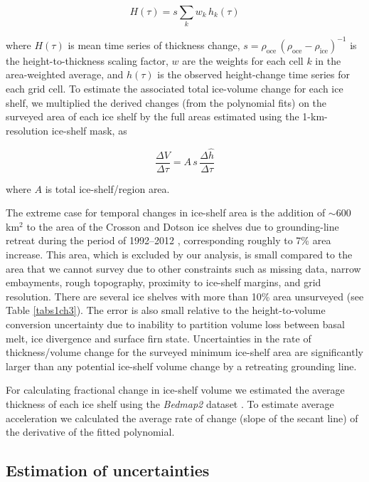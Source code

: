 \begin{equation}
  H(\tau) = s \sum_k w_k \, h_k(\tau)
\end{equation}

where $H(\tau)$ is mean time series of thickness change,
$s = \rho_{\text{oce}} \, (\rho_{\text{oce}} - \rho_{\text{ice}})^{-1}$ is the
height-to-thickness scaling factor, $w$ are the weights for each cell $k$
in the area-weighted average, and $h(\tau)$ is the observed height-change time
series for each grid cell. To estimate the associated total ice-volume change
for each ice shelf, we multiplied the derived changes (from the polynomial
fits) on the surveyed area of each ice shelf by the full areas estimated
using the 1-km-resolution ice-shelf mask, as

\begin{equation}
  \frac{\Delta V}{\Delta \tau} = A \, s \, \frac{\Delta \hat h}{\Delta \tau}
\end{equation}

where $A$ is total ice-shelf/region area.

The extreme case for temporal changes in ice-shelf area is the addition of
$\sim$600 km$^2$ to the area of the Crosson and Dotson ice shelves due to
grounding-line retreat during the period of 1992--2012 \parencite{Rignot2014},
corresponding roughly to 7\% area increase. This area, which is excluded by
our analysis, is small compared to the area that we cannot survey due to other
constraints such as missing data, narrow embayments, rough topography,
proximity to ice-shelf margins, and grid resolution. There are several ice
shelves with more than 10\% area unsurveyed (see Table \ref{tabs1ch3}). The
error is also small relative to the height-to-volume conversion uncertainty
due to inability to partition volume loss between basal melt, ice divergence
and surface firn state. Uncertainties in the rate of thickness/volume change
for the surveyed minimum ice-shelf area are significantly larger than any
potential ice-shelf volume change by a retreating grounding line.

For calculating fractional change in ice-shelf volume we estimated the average
thickness of each ice shelf using the \emph{Bedmap2} dataset
\parencite{Fretwell2013}. To estimate average acceleration we calculated the
average rate of change (slope of the secant line) of the derivative of the
fitted polynomial.

\subsection*{Estimation of uncertainties}

